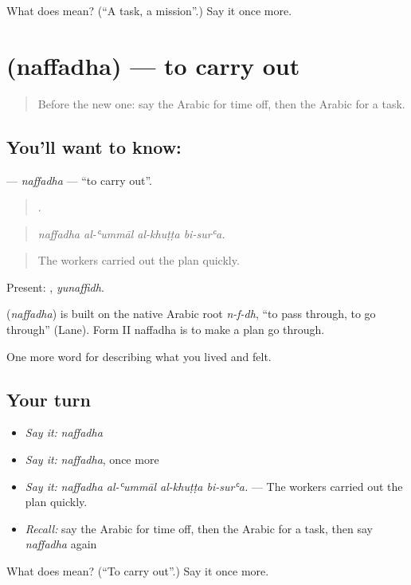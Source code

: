 \begin{tcolorbox}[breakable,colback=teal!4,colframe=teal!35!black,title={Before you move on}]
What does  mean? (\textquotedblleft{}A task, a mission\textquotedblright{}.) Say it once more.
\end{tcolorbox}
\section[\texorpdfstring{\ar{نفذ} (naffadha)}{نفذ (naffadha)}]{ (naffadha) — to carry out}

\label{lesson:AR-C520-naffadha}



\begin{quote}
Before the new one: say the Arabic for time off, then the Arabic for a task.
\end{quote}

\subsection*{You'll want to know: }
\textbf{} — \emph{naffadha} — \textquotedblleft{}to carry out\textquotedblright{}.

\begin{quote}
   .
\end{quote}

\begin{quote}
\emph{naffadha al-ʿummāl al-khuṭṭa bi-surʿa.}
\end{quote}

\begin{quote}
The workers carried out the plan quickly.
\end{quote}

Present: , \emph{yunaffidh}.

\begin{cousinweb}
\textbf{} (\emph{naffadha}) is built on the native Arabic root \emph{n-f-dh}, \textquotedblleft{}to pass through, to go through\textquotedblright{} (Lane). Form II naffadha is to make a plan go through.
\end{cousinweb}

\begin{grammarlens}[title={What you've built}]
One more word for describing what you lived and felt.
\end{grammarlens}

\subsection*{Your turn}
\begin{itemize}
\raggedright
  \item \emph{Say it:} \emph{naffadha}
  \item \emph{Say it:} \emph{naffadha}, once more
  \item \emph{Say it:} \emph{naffadha al-ʿummāl al-khuṭṭa bi-surʿa.} — The workers carried out the plan quickly.
  \item \emph{Recall:} say the Arabic for time off, then the Arabic for a task, then say \emph{naffadha} again
\end{itemize}

\begin{tcolorbox}[breakable,colback=teal!4,colframe=teal!35!black,title={Before you move on}]
What does  mean? (\textquotedblleft{}To carry out\textquotedblright{}.) Say it once more.
\end{tcolorbox}
